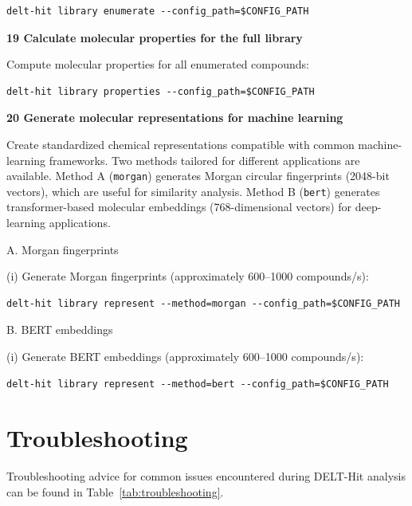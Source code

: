 \documentclass[pdflatex,sn-nature]{sn-jnl}
\newcommand{\protocolstep}[2]{\par\medskip\noindent\textbf{#1 \textbar{} #2}\par}
\begin{document}
\begin{lstlisting}
delt-hit library enumerate --config_path=$CONFIG_PATH
\end{lstlisting}

\protocolstep{19}{Calculate molecular properties for the full library}

Compute molecular properties for all enumerated compounds:

\begin{lstlisting}
delt-hit library properties --config_path=$CONFIG_PATH
\end{lstlisting}

\protocolstep{20}{Generate molecular representations for machine learning}

Create standardized chemical representations compatible with common machine-learning frameworks. Two methods tailored for different applications are available. Method A (\texttt{morgan}) generates Morgan circular fingerprints (2048-bit vectors), which are useful for similarity analysis. Method B (\texttt{bert}) generates transformer-based molecular embeddings (768-dimensional vectors) for deep-learning applications.


A. Morgan fingerprints

(i) Generate Morgan fingerprints (approximately 600--1000 compounds/s):
\begin{lstlisting}
delt-hit library represent --method=morgan --config_path=$CONFIG_PATH
\end{lstlisting}

B. BERT embeddings

(i) Generate BERT embeddings (approximately 600--1000 compounds/s):
\begin{lstlisting}
delt-hit library represent --method=bert --config_path=$CONFIG_PATH
\end{lstlisting}

\section{Troubleshooting}
Troubleshooting advice for common issues encountered during DELT-Hit analysis can be found in Table~\ref{tab:troubleshooting}.
\end{document}
